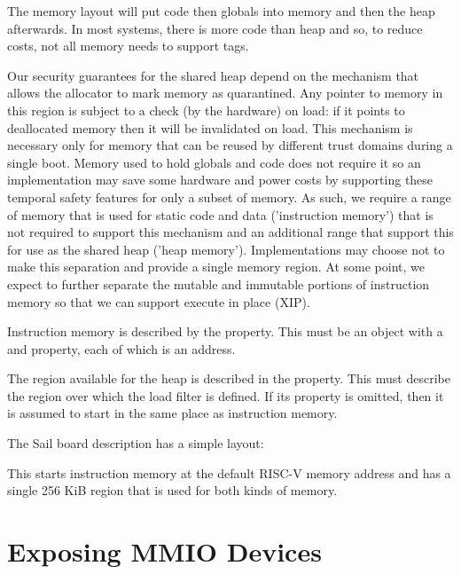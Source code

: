 The memory layout will put code then globals into memory and then the heap afterwards.
In most systems, there is more code than heap and so, to reduce costs, not all memory needs to support tags.

Our security guarantees for the shared heap depend on the mechanism that allows the allocator to mark memory as quarantined.
Any pointer to memory in this region is subject to a check (by the hardware) on load: if it points to deallocated memory then it will be invalidated on load.
This mechanism is necessary only for memory that can be reused by different trust domains during a single boot.
Memory used to hold globals and code does not require it so an implementation may save some hardware and power costs by supporting these temporal safety features for only a subset of memory.
As such, we require a range of memory that is used for static code and data ('instruction memory') that is not required to support this mechanism and an additional range that  support this for use as the shared heap ('heap memory').
Implementations may choose not to make this separation and provide a single memory region.
At some point, we expect to further separate the mutable and immutable portions of instruction memory so that we can support execute in place (XIP).

Instruction memory is described by the  property.
This must be an object with a  and  property, each of which is an address.

The region available for the heap is described in the  property.
This must describe the region over which the load filter is defined.
If its  property is omitted, then it is assumed to start in the same place as instruction memory.

The Sail board description has a simple layout:

\begin{jsonsnippet}
    "instruction_memory": {
        "start": 0x80000000,
        "end": 0x80040000
    \},
    "heap": {
        "end": 0x80040000
    \},
\end{jsonsnippet}

This starts instruction memory at the default RISC-V memory address and has a single 256 KiB region that is used for both kinds of memory.

\section{Exposing MMIO Devices}

